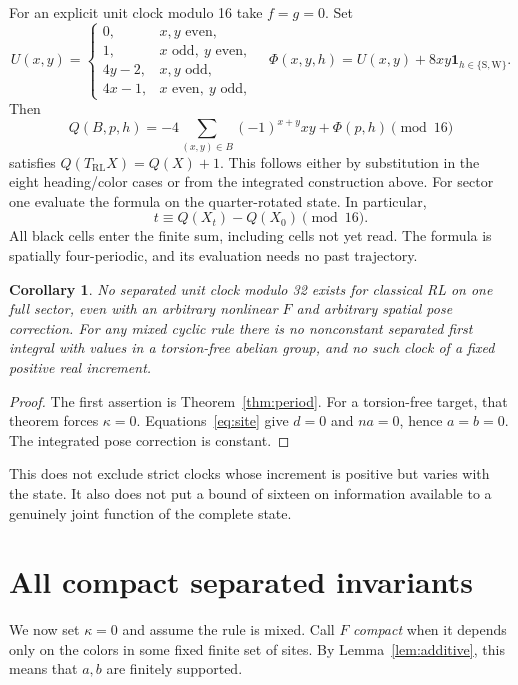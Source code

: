 \documentclass[11pt]{article}
\newtheorem{corollary}[theorem]{Corollary}
\theoremstyle{definition}
\newcommand{\ind}{\mathbf 1}
\begin{document}
For an explicit unit clock modulo 16 take $f=g=0$. Set
\begin{equation}\label{eq:Phi}
 U(x,y)=\begin{cases}
 0,&x,y\text{ even},\\
 1,&x\text{ odd},\ y\text{ even},\\
 4y-2,&x,y\text{ odd},\\
 4x-1,&x\text{ even},\ y\text{ odd},
 \end{cases}\quad
 \Phi(x,y,h)=U(x,y)+8xy\ind_{h\in\{\mathrm S,\mathrm W\}}.
\end{equation}
Then
\begin{equation}\label{eq:Q16}
 Q(B,p,h)=-4\sum_{(x,y)\in B}(-1)^{x+y}xy+\Phi(p,h)\pmod {16}
\end{equation}
satisfies $Q(T_{\mathrm{RL}}X)=Q(X)+1$. This follows either by substitution
in the eight heading/color cases or from the integrated construction above.
For sector one evaluate the formula on the quarter-rotated state. In particular,
\begin{equation}\label{eq:time}
 t\equiv Q(X_t)-Q(X_0)\pmod {16}.
\end{equation}
All black cells enter the finite sum, including cells not yet read. The formula
is spatially four-periodic, and its evaluation needs no past trajectory.

\begin{corollary}
No separated unit clock modulo 32 exists for classical RL on one full sector,
even with an arbitrary nonlinear $F$ and arbitrary spatial pose correction.
For any mixed cyclic rule there is no nonconstant separated first integral
with values in a torsion-free abelian group, and no such clock of a fixed
positive real increment.
\end{corollary}
\begin{proof}
The first assertion is Theorem~\ref{thm:period}. For a torsion-free target,
that theorem forces $\kappa=0$. Equations~\eqref{eq:site} give $d=0$ and
$na=0$, hence $a=b=0$. The integrated pose correction is constant.
\end{proof}
This does not exclude strict clocks whose increment is positive but varies
with the state. It also does not put a bound of sixteen on information available
to a genuinely joint function of the complete state.

\section{All compact separated invariants}
We now set $\kappa=0$ and assume the rule is mixed. Call $F$ \emph{compact}
when it depends only on the colors in some fixed finite set of sites. By
Lemma~\ref{lem:additive}, this means that $a,b$ are finitely supported.
\end{document}
